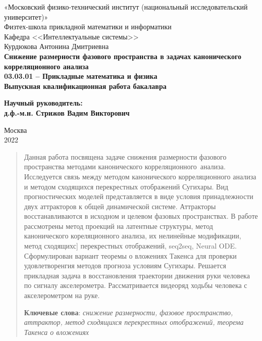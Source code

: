 \documentclass[12pt]{extarticle}
\begin{document}
\thispagestyle{empty}
\begin{center}
    \sc
        «Московский физико-технический институт \rm{(национальный исследовательский университет)}»\\
        Физтех-школа прикладной математики и информатики\\
        Кафедра <<Интеллектуальные системы>>
        \\[35mm]
    \rm\large
        Курдюкова Антонина Дмитриевна\\[10mm]
    \bf\Large
		Снижение размерности фазового пространства в задачах канонического корреляционного анализа\\[10mm]
    \rm\normalsize
        03.03.01 -- Прикладные математика и физика\\[10mm]
    \sc
        Выпускная квалификационная работа бакалавра\\[10mm]
\end{center}
\hfill\parbox{85mm}{
    \begin{flushleft}
    \bf
        Научный руководитель:\\
    \rm
        д.ф.-м.н. Стрижов Вадим Викторович\\[3.9cm]
    \end{flushleft}
}
\begin{center}
    Москва\\
    2022
\end{center}

\newpage
\tableofcontents
\newpage

\begin{abstract}
Данная работа посвящена задаче снижения размерности фазового пространства методами канонического корреляционного~анализа. Исследуется связь между методом канонического корреляционного анализа и методом сходящихся перекрестных отображений Сугихары. Вид прогностических моделей представляется в виде условия принадлежности двух аттракторов к общей динамической системе. Аттракторы восстанавливаются в исходном и целевом фазовых пространствах. В работе рассмотрены метод проекций на латентные структуры, метод канонического кореляционного анализа, их нелинейные модификации, метод сходящихс] перекрестных отображений, seq2seq, Neural ODE. Сформулирован вариант теоремы о вложениях Такенса для проверки удовлетворенгия методов прогноза условиям Сугихары. Решается прикладная задача в восстановления траектории движения руки человека по сигналу акселерометра. Рассматривается видеоряд ходьбы человека с акселерометром на руке.
\\
\bigskip
\noindent

\textbf{Ключевые слова}: \emph {снижение размерности, фазовое пространство, аттрактор, метод сходящихся перекрестных отображений, теорема Такенса о вложениях}
\end{abstract}
\newpage
\end{document}
